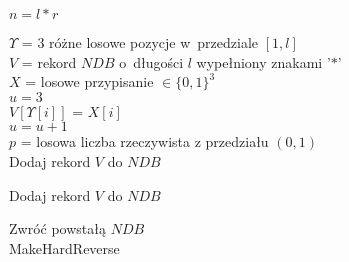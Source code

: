 \begin{algorithm}[!htb]
    \SetAlgoLined
    $n = l * r$\\
    {
        $\Upsilon$ = $3$ różne losowe pozycje w~przedziale $[1, l]$\\
        $V$ = rekord $NDB$ o~długości $l$ wypełniony znakami '$*$'\\
        $X$ = losowe przypisanie $\in \{0,1\}^3$\\ 
        
        $u = 3$\\ 
        {
            $V[\Upsilon[i]]$ = $X[i]$\\  
            {
                $u = u + 1$\\
            }
        }    
        {
            $p$ = losowa liczba rzeczywista z przedziału $(0,1)$\\
            {
                Dodaj rekord $V$ do $NDB$\\
            }    
        }
        
        Dodaj rekord $V$ do $NDB$
    } 
    
    Zwróć powstałą $NDB$\\
    \caption{MakeHardReverse}
    \label{alg:hybrid-makehard}
\end{algorithm}

